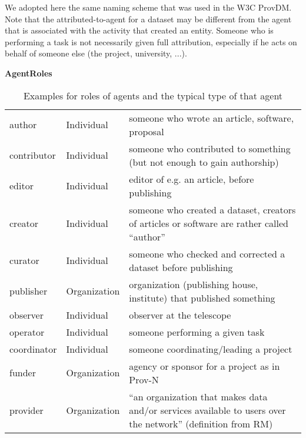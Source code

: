 We adopted here the same naming scheme that was used in the W3C ProvDM.
Note that the attributed-to-agent for a dataset may be different from the 
agent that is associated with the activity that created an entity.
Someone who is performing a task is not necessarily given full attribution, 
especially if he acts on behalf of someone else (the project, university, ...).


\begin{table}[h]
\small
{}\textwidth
\textbf{\normalsize AgentRoles}\vspace{0.25em}\\
\begin{tabulary}{1.0\textwidth}{@{}lp{3cm}L@{}}
\toprule
{} &  &  \\
\midrule
author & Individual & someone who wrote an article, software, proposal\\
contributor & Individual & someone who contributed to something (but not enough to gain authorship)\\
editor & Individual & editor of e.g. an article, before publishing\\
creator & Individual & someone who created a dataset, creators of articles or software are rather called ``author''\\
curator & Individual & someone who checked and corrected a dataset before publishing\\
publisher & Organization & organization (publishing house, institute) that published something\\
observer & Individual & observer at the telescope\\
operator & Individual & someone performing a given task \\ %
coordinator & Individual & someone coordinating/leading a project\\ %
funder & Organization & agency or sponsor for a project as in Prov-N\\
provider & Organization & ``an organization that makes data and/or services available to users over the network'' (definition from RM)\\
\bottomrule
\end{tabulary}
\caption[Examples for roles of agents]{Examples for roles of agents and the typical type of that agent}
\label{tab:agent-roles}
\end{table}

